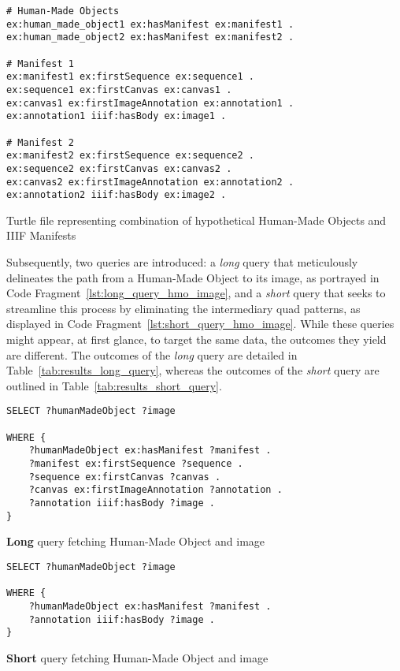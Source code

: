 \begin{listing}[htbp]
    \begin{verbatim}
# Human-Made Objects
ex:human_made_object1 ex:hasManifest ex:manifest1 .
ex:human_made_object2 ex:hasManifest ex:manifest2 .

# Manifest 1
ex:manifest1 ex:firstSequence ex:sequence1 .
ex:sequence1 ex:firstCanvas ex:canvas1 .
ex:canvas1 ex:firstImageAnnotation ex:annotation1 .
ex:annotation1 iiif:hasBody ex:image1 .

# Manifest 2
ex:manifest2 ex:firstSequence ex:sequence2 .
ex:sequence2 ex:firstCanvas ex:canvas2 .
ex:canvas2 ex:firstImageAnnotation ex:annotation2 .
ex:annotation2 iiif:hasBody ex:image2 .
    \end{verbatim}
    \caption{Turtle file representing combination of hypothetical Human-Made Objects and IIIF Manifests}
    \label{lst:turtle_hypothetical_combination}
\end{listing}

Subsequently, two queries are introduced: a \textit{long} query that meticulously delineates the path from a Human-Made Object to its image, as portrayed in Code Fragment~\ref{lst:long_query_hmo_image}, and a \textit{short} query that seeks to streamline this process by eliminating the intermediary quad patterns, as displayed in Code Fragment~\ref{lst:short_query_hmo_image}. While these queries might appear, at first glance, to target the same data, the outcomes they yield are different. The outcomes of the \textit{long} query are detailed in Table~\ref{tab:results_long_query}, whereas the outcomes of the \textit{short} query are outlined in Table~\ref{tab:results_short_query}.

\begin{listing}[htbp]
    \begin{verbatim}
SELECT ?humanMadeObject ?image

WHERE {
    ?humanMadeObject ex:hasManifest ?manifest .
    ?manifest ex:firstSequence ?sequence .
    ?sequence ex:firstCanvas ?canvas .
    ?canvas ex:firstImageAnnotation ?annotation .
    ?annotation iiif:hasBody ?image .
}
    \end{verbatim}
    \caption{\textbf{Long} query fetching Human-Made Object and image}
    \label{lst:long_query_hmo_image}
\end{listing}

\begin{listing}[htbp]
    \begin{verbatim}
SELECT ?humanMadeObject ?image

WHERE {
    ?humanMadeObject ex:hasManifest ?manifest .
    ?annotation iiif:hasBody ?image .
}
    \end{verbatim}
    \caption{\textbf{Short} query fetching Human-Made Object and image}
    \label{lst:short_query_hmo_image}
\end{listing}

